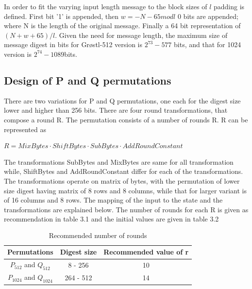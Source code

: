   In order to fit the varying input length message to the block sizes of $ l $ padding is defined. First bit '1' is
  appended, then $ w = -N - 65 mod l $ 0 bits are appended; where N is the length of the original message. Finally a
  64 bit representation of $(N + w + 65) / l $. Given the need for message length, the maximum size of message digest
  in bits for Gr{\o}stl-512 version is $2^{73}-577$ bits, and that for 1024 version is $2^{74}-1089$bits.

  \subsection{Design of P and Q permutations}

  There are two variations for P and Q permutations, one each for the digest size lower and higher than 256 bits. There
  are four round transformations, that compose a round R. The permutation consists of a number of rounds R. R can be
  represented as 
  \begin{center}$ R = MixBytes \cdot ShiftBytes \cdot SubBytes \cdot AddRoundConstant $ \end{center}
  The transformations SubBytes and MixBytes are same for all transformation while, ShiftBytes and AddRoundConstant differ
  for each of the transformations. The transformations operate on matrix of bytes, with the permutation of lower size
  digest having matrix of 8 rows and 8 columns, while that for larger variant is of 16 columns and 8 rows. The mapping of
  the input to the state and the transformations are explained below. The number of rounds for each R is given as 
  recommendation in table 3.1 and the initial values are given in table 3.2
  
  \begin{table}
    \begin{center}
      \begin{tabular}{ *{3}{c} } \hline
        Permutations            & Digest size & Recommended value of r \\ \hline
        $P_{512}$ and $Q_{512}$   & 8 - 256     & 10 \\
        $P_{1024}$ and $Q_{1024}$ & 264 - 512   & 14 \\ \hline 
      \end{tabular}
      \caption{Recommended number of rounds\cite{00019}}
    \end{center}
  \end{table}

